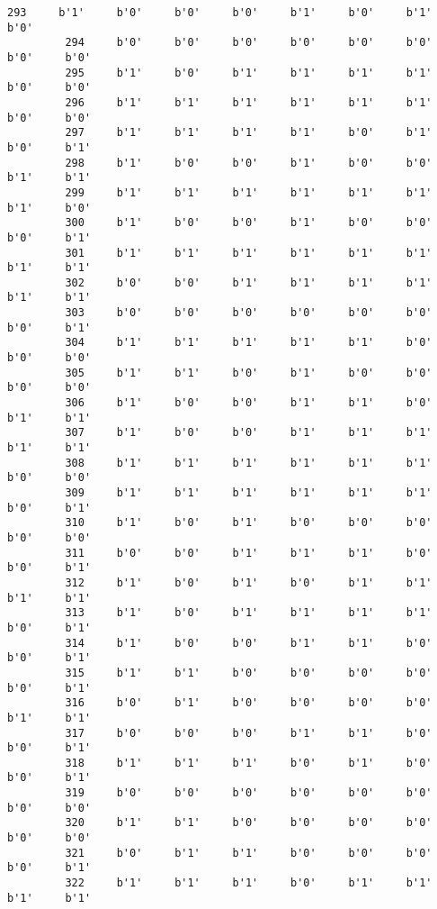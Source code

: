 \documentclass[11pt]{article}
\begin{document}
\begin{Verbatim}[commandchars=\\\{\}]
         293     b'1'     b'0'     b'0'     b'0'     b'1'     b'0'     b'1'     b'0'   
         294     b'0'     b'0'     b'0'     b'0'     b'0'     b'0'     b'0'     b'0'   
         295     b'1'     b'0'     b'1'     b'1'     b'1'     b'1'     b'0'     b'0'   
         296     b'1'     b'1'     b'1'     b'1'     b'1'     b'1'     b'0'     b'0'   
         297     b'1'     b'1'     b'1'     b'1'     b'0'     b'1'     b'0'     b'1'   
         298     b'1'     b'0'     b'0'     b'1'     b'0'     b'0'     b'1'     b'1'   
         299     b'1'     b'1'     b'1'     b'1'     b'1'     b'1'     b'1'     b'0'   
         300     b'1'     b'0'     b'0'     b'1'     b'0'     b'0'     b'0'     b'1'   
         301     b'1'     b'1'     b'1'     b'1'     b'1'     b'1'     b'1'     b'1'   
         302     b'0'     b'0'     b'1'     b'1'     b'1'     b'1'     b'1'     b'1'   
         303     b'0'     b'0'     b'0'     b'0'     b'0'     b'0'     b'0'     b'1'   
         304     b'1'     b'1'     b'1'     b'1'     b'1'     b'0'     b'0'     b'0'   
         305     b'1'     b'1'     b'0'     b'1'     b'0'     b'0'     b'0'     b'0'   
         306     b'1'     b'0'     b'0'     b'1'     b'1'     b'0'     b'1'     b'1'   
         307     b'1'     b'0'     b'0'     b'1'     b'1'     b'1'     b'1'     b'1'   
         308     b'1'     b'1'     b'1'     b'1'     b'1'     b'1'     b'0'     b'0'   
         309     b'1'     b'1'     b'1'     b'1'     b'1'     b'1'     b'0'     b'1'   
         310     b'1'     b'0'     b'1'     b'0'     b'0'     b'0'     b'0'     b'0'   
         311     b'0'     b'0'     b'1'     b'1'     b'1'     b'0'     b'0'     b'1'   
         312     b'1'     b'0'     b'1'     b'0'     b'1'     b'1'     b'1'     b'1'   
         313     b'1'     b'0'     b'1'     b'1'     b'1'     b'1'     b'0'     b'1'   
         314     b'1'     b'0'     b'0'     b'1'     b'1'     b'0'     b'0'     b'1'   
         315     b'1'     b'1'     b'0'     b'0'     b'0'     b'0'     b'0'     b'1'   
         316     b'0'     b'1'     b'0'     b'0'     b'0'     b'0'     b'1'     b'1'   
         317     b'0'     b'0'     b'0'     b'1'     b'1'     b'0'     b'0'     b'1'   
         318     b'1'     b'1'     b'1'     b'0'     b'1'     b'0'     b'0'     b'1'   
         319     b'0'     b'0'     b'0'     b'0'     b'0'     b'0'     b'0'     b'0'   
         320     b'1'     b'1'     b'0'     b'0'     b'0'     b'0'     b'0'     b'0'   
         321     b'0'     b'1'     b'1'     b'0'     b'0'     b'0'     b'0'     b'1'   
         322     b'1'     b'1'     b'1'     b'0'     b'1'     b'1'     b'1'     b'1'   

\end{Verbatim}
\end{document}
